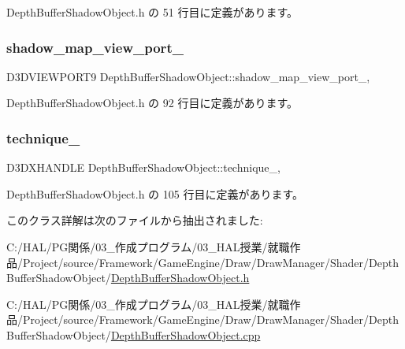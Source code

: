  Depth\+Buffer\+Shadow\+Object.\+h の 51 行目に定義があります。

\mbox{\label{class_depth_buffer_shadow_object_a08c029f49fa8cf59b8458d3c2be0138e}} 
\subsubsection{\texorpdfstring{shadow\+\_\+map\+\_\+view\+\_\+port\+\_\+}{shadow\_map\_view\_port\_}}
{\footnotesize\ttfamily D3\+D\+V\+I\+E\+W\+P\+O\+R\+T9 Depth\+Buffer\+Shadow\+Object\+::shadow\+\_\+map\+\_\+view\+\_\+port\+\_\+\hspace{0.3cm}{\ttfamily [static]}, {\ttfamily [private]}}



 Depth\+Buffer\+Shadow\+Object.\+h の 92 行目に定義があります。

\mbox{\label{class_depth_buffer_shadow_object_ab8fd271667e849ed9dfbdf9de2fe9fa5}} 
\subsubsection{\texorpdfstring{technique\+\_\+}{technique\_}}
{\footnotesize\ttfamily D3\+D\+X\+H\+A\+N\+D\+LE Depth\+Buffer\+Shadow\+Object\+::technique\+\_\+\hspace{0.3cm}{\ttfamily [static]}, {\ttfamily [private]}}



 Depth\+Buffer\+Shadow\+Object.\+h の 105 行目に定義があります。



このクラス詳解は次のファイルから抽出されました\+:\begin{DoxyCompactItemize}
\item 
C\+:/\+H\+A\+L/\+P\+G関係/03\+\_\+作成プログラム/03\+\_\+\+H\+A\+L授業/就職作品/\+Project/source/\+Framework/\+Game\+Engine/\+Draw/\+Draw\+Manager/\+Shader/\+Depth\+Buffer\+Shadow\+Object/\mbox{\hyperlink{_depth_buffer_shadow_object_8h}{Depth\+Buffer\+Shadow\+Object.\+h}}\item 
C\+:/\+H\+A\+L/\+P\+G関係/03\+\_\+作成プログラム/03\+\_\+\+H\+A\+L授業/就職作品/\+Project/source/\+Framework/\+Game\+Engine/\+Draw/\+Draw\+Manager/\+Shader/\+Depth\+Buffer\+Shadow\+Object/\mbox{\hyperlink{_depth_buffer_shadow_object_8cpp}{Depth\+Buffer\+Shadow\+Object.\+cpp}}\end{DoxyCompactItemize}
